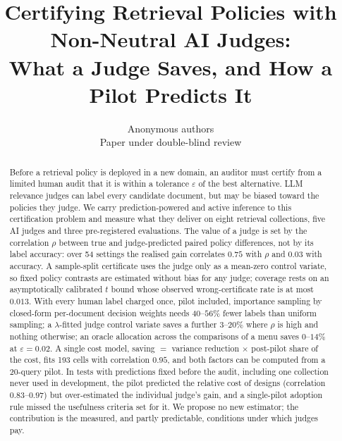 \documentclass{article}
\title{Certifying Retrieval Policies with Non-Neutral AI Judges:\\ What a Judge Saves, and How a Pilot Predicts It}
\author{\name Anonymous authors \\ \addr Paper under double-blind review}
\newcommand{\eps}{\varepsilon}
\begin{document}
\maketitle

\begin{abstract}
Before a retrieval policy is deployed in a new domain, an auditor must certify from a limited human audit that it is within a tolerance $\eps$ of the best alternative. LLM relevance judges can label every candidate document, but may be biased toward the policies they judge. We carry prediction-powered and active inference to this certification problem and measure what they deliver on eight retrieval collections, five AI judges and three pre-registered evaluations. The value of a judge is set by the correlation $\rho$ between true and judge-predicted paired policy differences, not by its label accuracy: over 54 settings the realised gain correlates $0.75$ with $\rho$ and $0.03$ with accuracy. A sample-split certificate uses the judge only as a mean-zero control variate, so fixed policy contrasts are estimated without bias for any judge; coverage rests on an asymptotically calibrated $t$ bound whose observed wrong-certificate rate is at most $0.013$. With every human label charged once, pilot included, importance sampling by closed-form per-document decision weights needs $40$--$56\%$ fewer labels than uniform sampling; a $\lambda$-fitted judge control variate saves a further $3$--$20\%$ where $\rho$ is high and nothing otherwise; an oracle allocation across the comparisons of a menu saves $0$--$14\%$ at $\eps=0.02$. A single cost model, saving $=$ variance reduction $\times$ post-pilot share of the cost, fits 193 cells with correlation $0.95$, and both factors can be computed from a 20-query pilot. In tests with predictions fixed before the audit, including one collection never used in development, the pilot predicted the relative cost of designs (correlation $0.83$--$0.97$) but over-estimated the individual judge's gain, and a single-pilot adoption rule missed the usefulness criteria set for it. We propose no new estimator; the contribution is the measured, and partly predictable, conditions under which judges pay.
\end{abstract}
\end{document}

